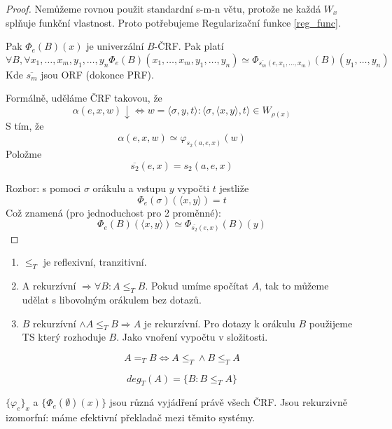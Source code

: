 \begin{theorem}\label{s_m_n_rel}
\end{theorem}
\begin{proof}
	Nemůžeme rovnou použit standardní s-m-n větu, protože ne každá $W_x$ splňuje funkční vlastnost.
	Proto potřebujeme Regularizační funkce \cref{reg_func}.

	Pak $\Phi_e(B)(x)$ je univerzální $B$-ČRF.
	Pak platí
	\[ \forall B, \forall x_1, \ldots, x_m, y_1, \ldots, y_n \Phi_e(B)(x_1, \ldots, x_m, y_1, \ldots, y_n) \simeq \Phi_{\overline{s_m}(e, x_1, \ldots, x_m)}(B)(y_1, \ldots, y_n) \]
	Kde $\overline{s_m}$ jsou ORF (dokonce PRF).

	Formálně, uděláme ČRF takovou, že
	\[ \alpha(e, x, w) \downarrow \iff w = \langle \sigma, y, t \rangle: \langle \sigma, \langle x, y \rangle, t \rangle \in W_{\rho(x)} \]
	S tím, že
	\[ \alpha(e, x, w) \simeq \varphi_{s_2(a, e, x)}(w) \]
	Položme
	\[ \overline{s_2}(e, x) = s_2(a, e, x) \]

	Rozbor: s pomoci $\sigma$ orákulu a vstupu $y$ vypočti $t$ jestliže
	\[ \Phi_e(\sigma)(\langle x, y \rangle) = t \]
	Což znamená (pro jednoduchost pro 2 proměnné):
	\[ \Phi_e(B)(\langle x, y \rangle) \simeq \Phi_{\overline{s_2}(e, x)}(B)(y) \]
\end{proof}


\begin{note}
	\begin{enumerate}
		\item $\leq_T$ je reflexivní, tranzitivní.
		\item A rekurzívní $\Rightarrow \forall B: A \leq_T B$.
		Pokud umíme spočítat $A$, tak to můžeme udělat s libovolným orákulem bez dotazů.
		\item $B$ rekurzívní $\land A \leq_T B \Rightarrow A$ je rekurzívní.
			Pro dotazy k orákulu $B$ použijeme TS který rozhoduje $B$.
			Jako vnoření vypočtu v složitosti.
	\end{enumerate}
\end{note}

\begin{definition}
	\[ A =_T B \iff A \leq_T \land B \leq_T A \]
\end{definition}

\begin{definition}
	\[ deg_T(A) = \{ B: B \leq_T A \} \]
\end{definition}

\begin{note}
	$\{ \varphi_e \}_x$ a $\{ \Phi_e(\emptyset)(x) \}$ jsou různá vyjádření právě všech ČRF.
	Jsou rekurzivně izomorfní: máme efektivní překladač mezi těmito systémy.
\end{note}

